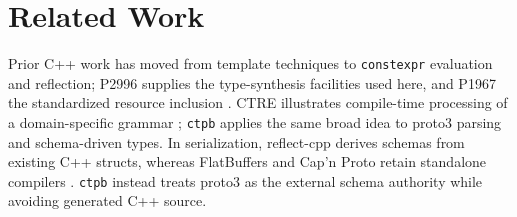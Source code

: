 \section{Related Work}

Prior C++ work has moved from template techniques to \texttt{constexpr} evaluation and reflection; P2996 supplies the type-synthesis facilities used here, and P1967 the standardized resource inclusion \cite{p1967,p2996}. CTRE illustrates compile-time processing of a domain-specific grammar \cite{ctre}; \texttt{ctpb} applies the same broad idea to proto3 parsing and schema-driven types. In serialization, reflect-cpp derives schemas from existing C++ structs, whereas FlatBuffers and Cap'n Proto retain standalone compilers \cite{reflect_cpp,flatbuffers,capnproto}. \texttt{ctpb} instead treats proto3 as the external schema authority while avoiding generated C++ source.
